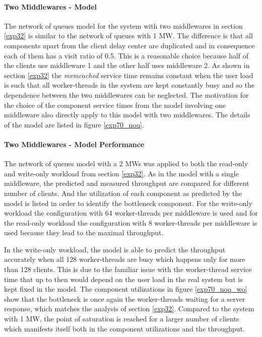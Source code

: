 \documentclass[report.tex]{subfiles}
\begin{document}
\paragraph{Two Middlewares - Model}

The network of queues model for the system with two middlewares in section \ref{exp32} is similar to the network of queues with 1 MW.
The difference is that all components apart from the client delay center are duplicated and in consequence each of them has a visit ratio of 0.5.
This is a reasonable choice because half of the clients use middleware 1 and the other half uses middleware 2. As shown in section \ref{exp32} the \emph{memcached} service time remains constant when the user load is such that all worker-threads in the system are kept constantly busy and so the dependence between the two middlewares can be neglected. The motivation for the choice of the component service times from the model involving one middleware also directly apply to this model with two middlewares.
The details of the model are listed in figure \ref{exp70_noq}.

\paragraph{Two Middlewares - Model Performance}
The network of queues model with a 2 MWs was applied to both the read-only and write-only workload from section \ref{exp32}.
As in the model with a single middleware, the predicted and measured throughput are compared for different number of clients.
And the utilization of each component as predicted by the model is listed in order to identify the bottleneck component. For the write-only workload the configuration with 64 worker-threads per middleware is used and for the read-only workload the configuration with 8 worker-threads per middleware is used because they lead to the maximal throughput.

In the write-only workload, the model is able to predict the throughput accurately when all 128 worker-threads are busy which happens only for more than 128 clients. This is due to the familiar issue with the worker-thread service time that up to then would depend on the user load in the real system but is kept fixed in the model.
The component utilizations in figure \ref{exp70_noq_wo} show that the bottleneck is once again the worker-threads waiting for a server response, which matches the analysis of section \ref{exp32}.  Compared to the system with 1 MW, the point of saturation is reached for a larger number of clients which manifests itself both in the component utilizations and the throughput.
\end{document}
